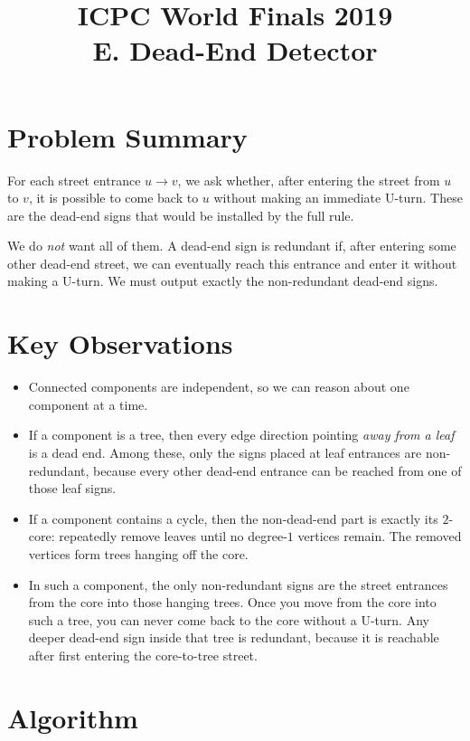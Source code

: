 \documentclass[11pt]{article}
\title{ICPC World Finals 2019\\E. Dead-End Detector}
\author{}
\date{}
\begin{document}
\maketitle

\section*{Problem Summary}

For each street entrance $u \to v$, we ask whether, after entering the street from $u$ to $v$, it is possible to come back to $u$ without making an immediate U-turn. These are the dead-end signs that would be installed by the full rule.

We do \emph{not} want all of them. A dead-end sign is redundant if, after entering some other dead-end street, we can eventually reach this entrance and enter it without making a U-turn. We must output exactly the non-redundant dead-end signs.

\section*{Key Observations}

\begin{itemize}[leftmargin=*]
    \item Connected components are independent, so we can reason about one component at a time.
    \item If a component is a tree, then every edge direction pointing \emph{away from a leaf} is a dead end. Among these, only the signs placed at leaf entrances are non-redundant, because every other dead-end entrance can be reached from one of those leaf signs.
    \item If a component contains a cycle, then the non-dead-end part is exactly its $2$-core: repeatedly remove leaves until no degree-$1$ vertices remain. The removed vertices form trees hanging off the core.
    \item In such a component, the only non-redundant signs are the street entrances from the core into those hanging trees. Once you move from the core into such a tree, you can never come back to the core without a U-turn. Any deeper dead-end sign inside that tree is redundant, because it is reachable after first entering the core-to-tree street.
\end{itemize}

\section*{Algorithm}
\end{document}
